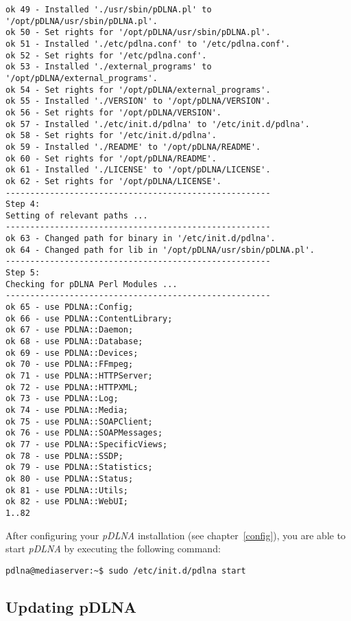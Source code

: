 \begin{lstlisting}
ok 49 - Installed './usr/sbin/pDLNA.pl' to '/opt/pDLNA/usr/sbin/pDLNA.pl'.
ok 50 - Set rights for '/opt/pDLNA/usr/sbin/pDLNA.pl'.
ok 51 - Installed './etc/pdlna.conf' to '/etc/pdlna.conf'.
ok 52 - Set rights for '/etc/pdlna.conf'.
ok 53 - Installed './external_programs' to '/opt/pDLNA/external_programs'.
ok 54 - Set rights for '/opt/pDLNA/external_programs'.
ok 55 - Installed './VERSION' to '/opt/pDLNA/VERSION'.
ok 56 - Set rights for '/opt/pDLNA/VERSION'.
ok 57 - Installed './etc/init.d/pdlna' to '/etc/init.d/pdlna'.
ok 58 - Set rights for '/etc/init.d/pdlna'.
ok 59 - Installed './README' to '/opt/pDLNA/README'.
ok 60 - Set rights for '/opt/pDLNA/README'.
ok 61 - Installed './LICENSE' to '/opt/pDLNA/LICENSE'.
ok 62 - Set rights for '/opt/pDLNA/LICENSE'.
------------------------------------------------------
Step 4:
Setting of relevant paths ...
------------------------------------------------------
ok 63 - Changed path for binary in '/etc/init.d/pdlna'.
ok 64 - Changed path for lib in '/opt/pDLNA/usr/sbin/pDLNA.pl'.
------------------------------------------------------
Step 5:
Checking for pDLNA Perl Modules ...
------------------------------------------------------
ok 65 - use PDLNA::Config;
ok 66 - use PDLNA::ContentLibrary;
ok 67 - use PDLNA::Daemon;
ok 68 - use PDLNA::Database;
ok 69 - use PDLNA::Devices;
ok 70 - use PDLNA::FFmpeg;
ok 71 - use PDLNA::HTTPServer;
ok 72 - use PDLNA::HTTPXML;
ok 73 - use PDLNA::Log;
ok 74 - use PDLNA::Media;
ok 75 - use PDLNA::SOAPClient;
ok 76 - use PDLNA::SOAPMessages;
ok 77 - use PDLNA::SpecificViews;
ok 78 - use PDLNA::SSDP;
ok 79 - use PDLNA::Statistics;
ok 80 - use PDLNA::Status;
ok 81 - use PDLNA::Utils;
ok 82 - use PDLNA::WebUI;
1..82
\end{lstlisting}

After configuring your {\em pDLNA} installation (see chapter~\ref{config}), you are able to start {\em pDLNA} by executing the following command:
\begin{lstlisting}
pdlna@mediaserver:~$ sudo /etc/init.d/pdlna start
\end{lstlisting}

\subsection{Updating pDLNA}
\label{install-unix-latest-release-updating}

